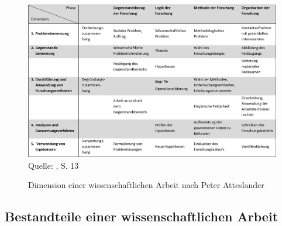 \begin{figure}[h]
\centering
\includegraphics[width=1\textwidth]{Bilder/Abbildung.png}
Quelle: \citet{atteslander2010}, S. 13
\caption{Dimension einer wissenschaftlichen Arbeit nach Peter Atteslander}
\label{abb:abbildung1}
\end{figure}










\clearpage



\subsection{Bestandteile einer wissenschaftlichen Arbeit}



